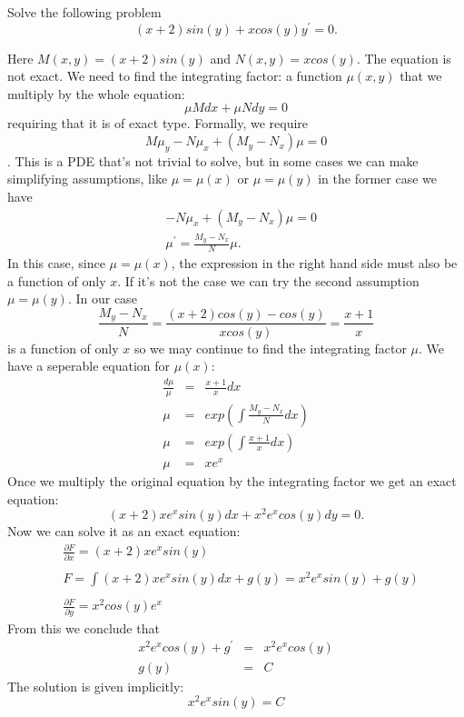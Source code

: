 \documentclass[11pt]{article}
\begin{document}
\begin{problem}
Solve the following problem
\begin{equation*}
\left( x + 2 \right) sin(y) + x cos(y) y^{\prime} = 0.
\end{equation*}
\end{problem}

\begin{solution}
  Here $M(x, y) = \left( x + 2 \right) sin(y)$ and $N(x, y) = x cos(y)$. The equation
  is not exact. We need to find the integrating factor: a function $\mu(x, y)$ that
  we multiply by the whole equation:
  \[ \mu M dx + \mu N dy = 0 \]
  requiring that it is of exact type. Formally, we require
  \[ M \mu_y - N \mu_x + \left( M_y - N_x \right) \mu = 0 \].
  This is a PDE that's not trivial to solve, but in some cases we can make
  simplifying assumptions, like $\mu = \mu(x)$ or $\mu = \mu(y)$ in the former case
  we have
  \begin{eqnarray*}
    & -N \mu_x + \left( M_y - N_x \right) \mu = 0 \\
    & \mu^{\prime} = \frac {M_y - N_x} {N} \mu.
  \end{eqnarray*}
  In this case, since $\mu = \mu(x)$, the expression in the right hand side
  must also be a function of only $x$. If it's not the case we can try the second
  assumption $\mu = \mu(y)$.
  In our case
  \[ \frac {M_y - N_x} {N} = \frac {\left( x + 2 \right) cos(y) - cos(y)} {x cos(y)}
    = \frac {x+1} {x} \]
  is a function of only $x$ so we may continue to find the integrating factor $\mu$.
  We have a seperable equation for $\mu(x)$:
  \begin{eqnarray*}
    \frac {d \mu} {\mu} & = & \frac {x+1} {x} dx \\
    \mu & = & exp \left(\int \frac {M_y - N_x} {N} dx \right) \\
    \mu & = & exp \left(\int \frac {x+1} {x} dx \right) \\
    \mu & = & x e^x
  \end{eqnarray*}
  Once we multiply the original equation by the integrating factor we get an exact
  equation:
  \[ \left( x + 2 \right) x e^x sin(y) dx + x^2 e^x cos(y) dy = 0. \]
  Now we can solve it as an exact equation:
  \begin{eqnarray*}
    & \frac {\partial F} {\partial x} = \left( x + 2 \right) x e^x sin(y) \\\\
    & F = \int \left( x + 2 \right) x e^x sin(y) dx + g(y) = x^2 e^x sin(y) + g(y) \\\\
    & \frac {\partial F} {\partial y} = x^2 cos(y) e^x
  \end{eqnarray*}
  From this we conclude that
  \begin{eqnarray*}
    x^2 e^x cos(y) + g^{\prime} & = & x^2 e^x cos(y)\\
    g(y) & = & C
  \end{eqnarray*}
  The solution is given implicitly:
  \[ \boxed{ x^2 e^x sin(y) = C } \]
  
  
\end{solution}
\end{document}

